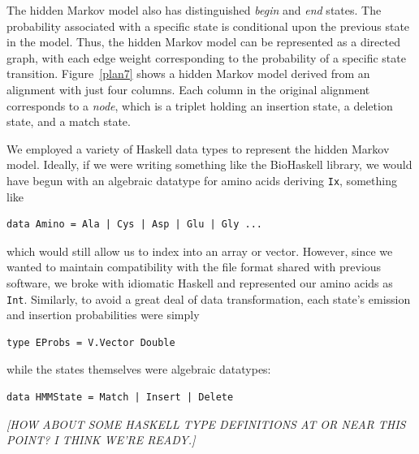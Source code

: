 \documentclass[preprint,nonatbib,blockstyle,nocopyrightspace,times]{sigplanconf}
\newcommand\figref[1]{Figure~\ref{#1}}
\begin{document}
The hidden Markov model also has distinguished \emph{begin} and \emph{end} states.
The probability associated with a specific state is conditional upon the previous
state in the model.
Thus, the hidden Markov model can be represented as a directed graph, with each
edge weight corresponding to the probability of a specific state transition.
\figref{plan7} shows a hidden Markov model derived from an alignment
with just four columns.
Each column in the original alignment corresponds to a \emph{node},
which is a triplet holding an insertion state, a deletion state, and a
match state.

We employed a variety of Haskell data types to represent the hidden Markov
model.
Ideally, if we were writing something like the BioHaskell library, we would
have begun with an algebraic datatype for amino acids deriving
\texttt{Ix}, something like
\begin{verbatim}data Amino = Ala | Cys | Asp | Glu | Gly ...\end{verbatim}
which would still allow us to index into an array or vector.
However, since we wanted to maintain compatibility with the file format
shared with previous software, we broke with idiomatic Haskell and represented
our amino acids as \texttt{Int}.
Similarly, to avoid a great deal of data transformation, each state's emission
and insertion probabilities were simply
\begin{verbatim}type EProbs = V.Vector Double \end{verbatim} while the states themselves
were algebraic datatypes: 
\begin{verbatim}data HMMState = Match | Insert | Delete \end{verbatim}


\emph{[HOW ABOUT SOME HASKELL TYPE DEFINITIONS AT OR NEAR THIS POINT?
    I THINK WE'RE READY.]}
    
\end{document}

